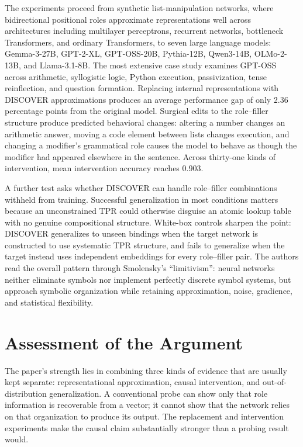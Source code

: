 \documentclass[11pt]{article}
\begin{document}
The experiments proceed from synthetic list-manipulation networks, where bidirectional positional roles approximate representations well across architectures including multilayer perceptrons, recurrent networks, bottleneck Transformers, and ordinary Transformers, to seven large language models: Gemma-3-27B, GPT-2-XL, GPT-OSS-20B, Pythia-12B, Qwen3-14B, OLMo-2-13B, and Llama-3.1-8B. The most extensive case study examines GPT-OSS across arithmetic, syllogistic logic, Python execution, passivization, tense reinflection, and question formation. Replacing internal representations with DISCOVER approximations produces an average performance gap of only 2.36 percentage points from the original model. Surgical edits to the role--filler structure produce predicted behavioral changes: altering a number changes an arithmetic answer, moving a code element between lists changes execution, and changing a modifier's grammatical role causes the model to behave as though the modifier had appeared elsewhere in the sentence. Across thirty-one kinds of intervention, mean intervention accuracy reaches 0.903.

A further test asks whether DISCOVER can handle role--filler combinations withheld from training. Successful generalization in most conditions matters because an unconstrained TPR could otherwise disguise an atomic lookup table with no genuine compositional structure. White-box controls sharpen the point: DISCOVER generalizes to unseen bindings when the target network is constructed to use systematic TPR structure, and fails to generalize when the target instead uses independent embeddings for every role--filler pair. The authors read the overall pattern through Smolensky's ``limitivism'': neural networks neither eliminate symbols nor implement perfectly discrete symbol systems, but approach symbolic organization while retaining approximation, noise, gradience, and statistical flexibility.

\section{Assessment of the Argument}

The paper's strength lies in combining three kinds of evidence that are usually kept separate: representational approximation, causal intervention, and out-of-distribution generalization. A conventional probe can show only that role information is recoverable from a vector; it cannot show that the network relies on that organization to produce its output. The replacement and intervention experiments make the causal claim substantially stronger than a probing result would.
\end{document}
